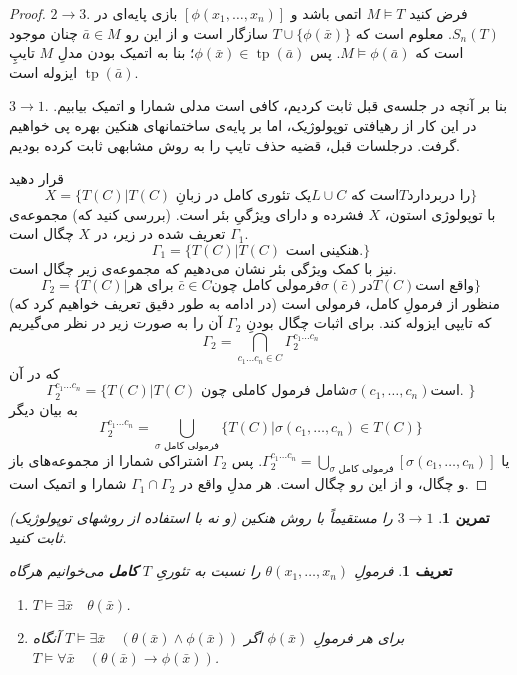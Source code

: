\documentclass[12pt,a4paper]{article}
\theoremstyle{colorhead}
\newtheorem{tam}[thm]{تمرین}
\newtheorem{defn}[thm]{تعریف}
\DeclareMathOperator{\tp}{tp}
\begin{document}
\begin{proof}
$2\to 3$.
فرض کنید
$M\models T$
اتمی باشد و 
$[\phi(x_1,\ldots,x_n)]$
بازی پایه‌ای در
$S_n(T)$.
معلوم است که 
$T\cup \{\phi(\bar{x})\}$
سازگار است و  از این رو
$\bar{a}\in M$
چنان موجود است که
$M\models \phi(\bar{a})$.
پس
$\phi(\bar{x})\in \tp(\bar{a})$؛
بنا به اتمیک بودن مدلِ
$M$
تایپِ
$\tp(\bar{a})$
ایزوله است. 
\par 
$3\to 1$.
بنا بر آنچه در جلسه‌ی قبل ثابت کردیم، کافی است مدلی شمارا و اتمیک بیابیم. در این کار از رهیافتی توپولوژیک، اما بر پایه‌ی ساختمانهای هنکین بهره  پی خواهیم گرفت.    درجلسات قبل، قضیه حذف تایپ را به روش مشابهی ثابت کرده بودیم.
\par 
قرار دهید
\[
X=\{T(C)|\text{$T(C)$ یک تئوری کامل در  زبانِ
$L\cup C$ است که
$T$
را دربردارد}
\}
\]
با  توپولوژی استون،
$X$
فشرده و دارای ویژگیِ
بئر است. (بررسی کنید که)
مجموعه‌ی
$\Gamma_1$
تعریف شده در زیر، در
$X$
چگال است. 
\[
\Gamma_1=\{T(C)| \text{$T(C)$ هنکینی است.}\}
\]
نیز با کمک ویژگی بئر نشان می‌دهیم که مجموعه‌ی زیر چگال است.
\[
\Gamma_2=\{T(C)|\text{برای هر 
$\bar{c}\in C$
فرمولی کامل چون
$\sigma(\bar{c})$
در
$T(C)$
واقع است
}\}
\]
(در ادامه به طور دقیق تعریف خواهیم کرد که) منظور از فرمولِ کامل، فرمولی است که 
تایپی ایزوله کند. برای اثبات چگال بودنِ
$\Gamma_2$
آن را به صورت زیر در نظر می‌گیریم
\[
\Gamma_2=\bigcap_{c_1\ldots c_n\in C }\Gamma_2^{c_1\ldots c_n}
\]
 که در آن
 \[
 \Gamma_2^{c_1\ldots c_n}=\{T(C)| \text{$T(C)$ شامل فرمول کاملی چون
$\sigma(c_1,\ldots,c_n)$
است. 
 }
\} 
 \]
به بیان دیگر
\[
 \Gamma_2^{c_1\ldots c_n}=\bigcup_{\text{$\sigma$ فرمولی کامل}} \{T(C)|\sigma(c_1,\ldots,c_n)\in T(C)\}
\]
یا
$\Gamma_2^{c_1\ldots c_n}=\bigcup_{\text{$\sigma$ فرمولی کامل}} [\sigma(c_1,\ldots,c_n)]$.
پس
$\Gamma_2$
اشتراکی شمارا از مجموعه‌های باز و چگال، و از این رو چگال است. هر مدلِ واقع در
$\Gamma_1\cap \Gamma_2$
شمارا و اتمیک است. 
\end{proof}
\begin{tam}
$3\to 1$
را مستقیماً با روش هنکین (و نه با استفاده از روشهای توپولوژیک) ثابت کنید.
\end{tam}
\begin{defn}
فرمولِ
$\theta(x_1,\ldots,x_n)$
را نسبت به تئوریِ
$T$
\textbf{کامل}
 می‌خوانیم هرگاه 
\begin{enumerate}
\item 
$T\models \exists\bar{x}\quad \theta(\bar{x})$.
\item
برای هر فرمولِ
$\phi(\bar{x})$
اگر
$T\models \exists \bar{x}\quad (\theta(\bar{x})\wedge \phi(\bar{x}))$
آنگاه 
$T\models \forall\bar{x}\quad (\theta(\bar{x})\to \phi(\bar{x}))$.
\end{enumerate}
\end{defn}
\end{document}
